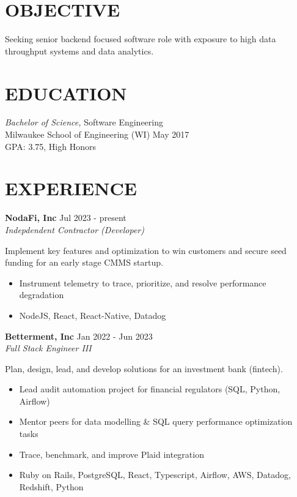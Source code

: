 \documentclass[line,margin]{res}
\begin{document}

\address{austin.dev@protonmail.com | (414) 334-4061}

\begin{resume}

\section{OBJECTIVE}
Seeking senior backend focused software role with exposure to high data throughput systems and data analytics.

\section{EDUCATION}
{\sl Bachelor of Science,} Software Engineering \\
Milwaukee School of Engineering (WI) \hfill May 2017 \\
GPA: 3.75, High Honors \\

\section{EXPERIENCE}

\textbf{NodaFi, Inc} \hfill Jul 2023 - present \\
{\sl Indepdendent Contractor (Developer)}

Implement key features and optimization to win customers and secure seed funding for an early stage CMMS startup.

\begin{itemize}
\item Instrument telemetry to trace, prioritize, and resolve performance degradation
\item NodeJS, React, React-Native, Datadog
\end{itemize}

\textbf{Betterment, Inc} \hfill Jan 2022 - Jun 2023 \\
{\sl Full Stack Engineer III}

Plan, design, lead, and develop solutions for an investment bank (fintech).

\begin{itemize}
\item Lead audit automation project for financial regulators (SQL, Python, Airflow)
\item Mentor peers for data modelling \& SQL query performance optimization tasks
\item Trace, benchmark, and improve Plaid integration
\item Ruby on Rails, PostgreSQL, React, Typescript, Airflow, AWS, Datadog, Redshift, Python
\end{itemize}


\end{resume}
\end{document}
